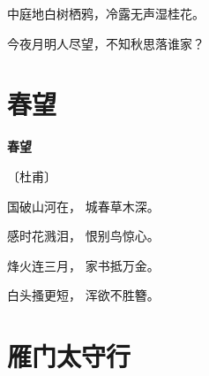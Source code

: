 \documentclass[12pt,UTF-8,openany,fontset=none]{ctexbook}
\begin{document}
    \vspace{18pt}  %

\begin{center}
    \begin{Large}

        中庭地白树栖鸦，冷露无声湿桂花。

        今夜月明人尽望，不知秋思落谁家？

    \end{Large}

\end{center}

\vspace{8pt}
\clearpage

\section{春望}


\begin{center}
    {\bfseries 春望}

    \vspace{18pt}

    \begin{large}\xuwen
        〔杜甫〕
    \end{large}

\end{center}

    \vspace{18pt}  %

\begin{center}
    \begin{Large}

        国破山河在， 城春草木深。

        感时花溅泪， 恨别鸟惊心。

        烽火连三月， 家书抵万金。

        白头搔更短， 浑欲不胜簪。

    \end{Large}

\end{center}

\vspace{8pt}
\clearpage

\section{雁门太守行}

\end{document}

